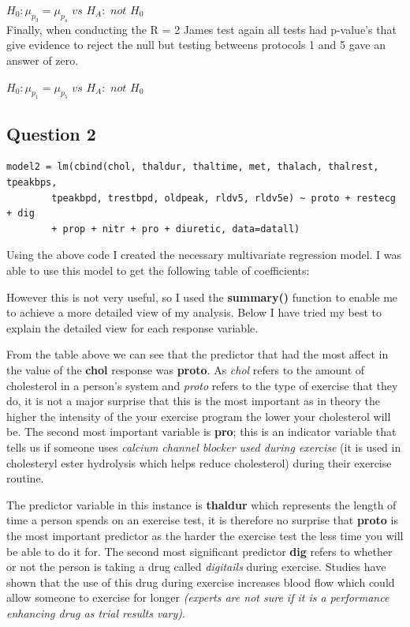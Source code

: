 \documentclass[a4paper]{article}
\begin{document}

$H_0 : \mu_{p_3} = \mu_{p_4}$ $vs$ $H_A :$ $not$ $H_0$\\

Finally, when conducting the R = 2 James test again all tests had p-value's that
give evidence to reject the null but testing betweens protocols 1 and 5 gave an
answer of zero.

$H_0 : \mu_{p_1} = \mu_{p_5}$ $vs$ $H_A :$ $not$ $H_0$\\

\newpage
\subsection{Question 2}

\begin{lstlisting}[frame=single]
model2 = lm(cbind(chol, thaldur, thaltime, met, thalach, thalrest, tpeakbps,
		tpeakbpd, trestbpd, oldpeak, rldv5, rldv5e) ~ proto + restecg + dig
		+ prop + nitr + pro + diuretic, data=datall)
\end{lstlisting}

Using the above code I created the necessary multivariate regression model.
I was able to use this model to get the following table of coefficients:

However this is not very useful, so I used the \textbf{summary()} function to
enable me to achieve a more detailed view of my analysis. Below I have tried
my best to explain the detailed view for each response variable.

\newpage

From the table above we can see that the predictor that had the most
affect in the value of the \textbf{chol} response was \textbf{proto}. As
\textit{chol} refers to the amount of cholesterol in a person's system and
\textit{proto} refers to the type of exercise that they do, it is not a major
surprise that this is the most important as in theory the higher the intensity
of the your exercise program the lower your cholesterol will be. The second most
important variable is \textbf{pro}; this is an indicator variable that tells us
if someone uses \textit{calcium channel blocker used during exercise} (it is
used in cholesteryl ester hydrolysis which helps reduce cholesterol) during
their exercise routine.

\newpage

The predictor variable in this instance is \textbf{thaldur} which represents the
length of time a person spends on an exercise test, it is therefore no surprise
that \textbf{proto} is the most important predictor as the harder the exercise
test the less time you will be able to do it for. The second most significant
predictor \textbf{dig} refers to whether or not the person is taking a drug
called \textit{digitails} during exercise. Studies have shown that the use of
this drug during exercise increases blood flow which could allow someone to
exercise for longer \textit{(experts are not sure if it is a performance
enhancing drug as trial results vary)}.
\end{document}
